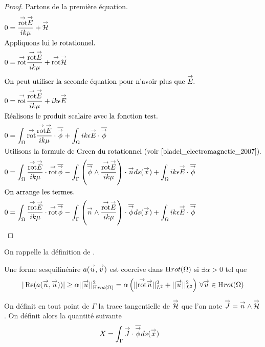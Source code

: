   \begin{proof}
    Partons de la première équation.
    \begin{align}
          0 & = \frac{\trot \vE}{ik\mu} + \vH
          \\ \intertext{Appliquons lui le rotationnel.}
          0 & = \trot \frac{\trot \vE}{ik\mu} + \trot \vH
          \\ \intertext{On peut utiliser la seconde équation pour n'avoir plus que \(\vE\).}
          0 & = \trot \frac{\trot \vE}{ik\mu} + ik\eps \vE
          \\ \intertext{Réalisons le produit scalaire avec la fonction test.}
          0 & = \int_\OO{ \trot \frac{\trot \vE}{ik\mu}\cdot \conj{\vect{\phi}}} +  \int_\OO ik\eps \vE \cdot \conj{\vect{\phi}}
          \\ \intertext{Utilisons la formule de Green du rotationnel (voir \cite[eq.~(A1.32)]{bladel_electromagnetic_2007}).}
          0 & = \int_\OO{ \frac{\trot \vE}{ik\mu}\cdot \trot \conj{\vect{\phi}}} - \int_\Gamma \left( \conj{\vect \phi} \pvect \frac{\trot \vE}{ik\mu}\right)  \cdot \vn ds(\vx) + \int_\OO ik\eps \vE \cdot \conj{\vect{\phi}}
          \\ \intertext{On arrange les termes.}
          0 & = \int_\OO \frac{\trot \vE}{ik\mu}\cdot \trot \conj{\vect{\phi}} - \int_\Gamma \left(\vn \pvect \frac{\trot \vE}{ik\mu}\right) \cdot \conj{\vect \phi} ds(\vx) +  \int_\OO ik\eps \vE \cdot \conj{\vect{\phi}}
      \end{align}
  \end{proof}

  On rappelle la définition de \cite[p.~59]{cessenat_mathematical_1996}.
  \begin{defn}
    Une forme sesquilinéaire \(a({\overset{\rightarrow}{u}},{\overset{\rightarrow}{v}})\) est coercive dans \(\mathrm{H}_\mathrm{{}}{rot}(\Omega)\) si \(\exists \alpha > 0\) tel que
    \[
      |\operatorname{Re}(a({\overset{\rightarrow}{u}},{\overset{\rightarrow}{u}}))| \ge \alpha ||{\overset{\rightarrow}{u}}||_{\mathrm{H}_\mathrm{{}}{rot}(\Omega)}^2 = \alpha \left( || {{\overset{\rightarrow}{\operatorname{rot}}}} {\overset{\rightarrow}{u}} ||_{L^2}^2 + || {\overset{\rightarrow}{u}} ||_{L^2}^2\right) \, \forall {\overset{\rightarrow}{u}} \in \mathrm{H}_\mathrm{{}}{rot}(\Omega)
    \]
   \end{defn}


  On définit en tout point de \(\Gamma\) la trace tangentielle de \({\overset{\rightarrow}{\mathcal{H}}}\) que l'on note \({\overset{\rightarrow}{J}} = {\overset{\rightarrow}{n}} \wedge {\overset{\rightarrow}{\mathcal{H}}}\). On définit alors la quantité suivante
  \begin{align}
    X &= \int_\Gamma {\overset{\rightarrow}{J}} \cdot {\overline{{\overset{\rightarrow}{\phi}}}} ds({\overset{\rightarrow}{x}})
  \end{align}

